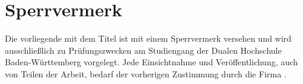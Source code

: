 
\section*{Sperrvermerk}

\vspace*{2em}

Die vorliegende {\arbeitsart} mit dem Titel {\itshape \titel} ist mit einem Sperrvermerk versehen und wird ausschließlich zu Prüfungszwecken am Studiengang {\studiengang} der Dualen Hochschule Baden-Württemberg {\abgabeort} vorgelegt.
Jede Einsichtnahme und Veröffentlichung, auch von Teilen der Arbeit, bedarf der vorherigen Zustimmung durch die Firma {\firma}.

